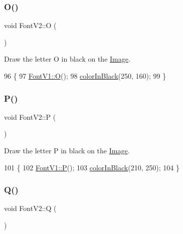 \subsubsection{\texorpdfstring{O()}{O()}}
{\footnotesize\ttfamily void Font\+V2\+::O (\begin{DoxyParamCaption}{ }\end{DoxyParamCaption})}



Draw the letter O in black on the \mbox{\hyperlink{class_image}{Image}}. 


\begin{DoxyCode}
96                \{
97     \mbox{\hyperlink{class_font_v1_a9338f8d780e9913a848310355973ebf3}{FontV1::O}}();
98     \mbox{\hyperlink{class_font_v2_a04f2501961bc286ce70fbb6a840b0e8a}{colorInBlack}}(250, 160);
99 \}
\end{DoxyCode}
\mbox{\label{class_font_v2_ab47b245b84ea5c1dd89055c83b6ea052}} 
\subsubsection{\texorpdfstring{P()}{P()}}
{\footnotesize\ttfamily void Font\+V2\+::P (\begin{DoxyParamCaption}{ }\end{DoxyParamCaption})}



Draw the letter P in black on the \mbox{\hyperlink{class_image}{Image}}. 


\begin{DoxyCode}
101                \{
102     \mbox{\hyperlink{class_font_v1_aeaf56ebe48a78aedf53626f50f10ee4d}{FontV1::P}}();
103     \mbox{\hyperlink{class_font_v2_a04f2501961bc286ce70fbb6a840b0e8a}{colorInBlack}}(210, 250);
104 \}
\end{DoxyCode}
\mbox{\label{class_font_v2_af8e979a962becf153ecc82051ad2c8fc}} 
\subsubsection{\texorpdfstring{Q()}{Q()}}
{\footnotesize\ttfamily void Font\+V2\+::Q (\begin{DoxyParamCaption}{ }\end{DoxyParamCaption})}



